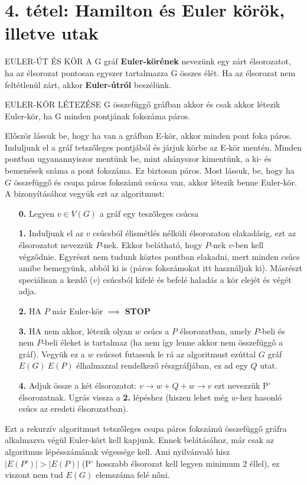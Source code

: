 \section{4. tétel: Hamilton és Euler körök, illetve utak}

\begin{definicio}{EULER-ÚT ÉS KÖR}
A G gráf \textbf{Euler-körének} nevezünk egy zárt élsorozatot, ha az élsorozat pontosan egyszer tartalmazza G összes élét. Ha az élsorozat nem feltétlenül zárt, akkor \textbf{Euler-útról} beszélünk.
\end{definicio}

\begin{tetel}{EULER-KÖR LÉTEZÉSE}
G összefüggő gráfban akkor és csak akkor létezik Euler-kör, ha G minden pontjának fokszáma páros.
\end{tetel}

\begin{bizonyitas}{}
  Először lássuk be, hogy ha van a gráfban E-kör, akkor minden pont foka páros. Induljunk el a gráf tetszőleges pontjából és járjuk körbe az E-kör mentén. Minden pontban ugyanannyiszor mentünk be, mint ahányszor kimentünk, a ki- és bemenések száma a pont fokszáma. Ez biztosan páros.
Most lássuk, be, hogy ha $G$ összefüggő és csupa páros fokszámú csúcsa van, akkor létezik benne Euler-kör. A bizonyításához vegyük ezt az algoritmust:
\begin{itemize}
\item[\textbf{0.}] Legyen $v \in V(G)$ a gráf egy teszőleges csúcsa
\item[\textbf{1.}] Induljunk el az $v$ csúcsból élismétlés nélküli élsorozaton elakadásig, ezt az élsorozatot nevezzük $P$-nek. Ekkor belátható, hogy $P$-nek $v$-ben kell végződnie. Egyrészt nem tudunk köztes pontban elakadni, mert minden csúcs amibe bemegyünk, abból ki is (páros fokszámokat itt használjuk ki). Másrészt speciálisan a kezdő ($v$) csúcsból kifelé és befelé haladás a kör elejét és végét adja.
\item[\textbf{2.}] HA $P$ már Euler-kör $\implies$ \textbf{STOP}
\item[\textbf{3.}] HA nem akkor, létezik olyan $w$ csúcs a $P$ élsorozatban, amely $P$-beli és nem $P$-beli éleket is tartalmaz (ha nem így lenne akkor nem összefüggő a gráf). Vegyük ez a $w $ csúcsot futassuk le rá az algoritmust ezúttal $G$ gráf $E(G) \ E(P)$ élhalmazzal rendelkező részgráfjában, ez ad egy $Q$ utat.
\item[\textbf{4.}] Adjuk össze a két élsorozatot: $v \rightarrow w + Q + w \rightarrow v$ ezt nevezzük P' élsorozatnak. Ugrás vissza a \textbf{2.} lépéshez (hiszen lehet még $w$-hez hasonló csúcs az eredeti élsorozatban).
\end{itemize}
Ezt a rekurzív algoritmust tetszőleges csupa páros fokszámú összefüggő gráfra alkalmazva végül Euler-kört kell kapjunk. Ennek belátásához, már csak az algoritmus lépésszámának végessége kell. Ami nyilvánvaló hisz $|E(P')| > |E(P)|$ (P' hosszabb élsorozat kell legyen minimum 2 éllel), ez viszont nem tud $E(G)$ elemszáma felé nőni.
\end{bizonyitas}

